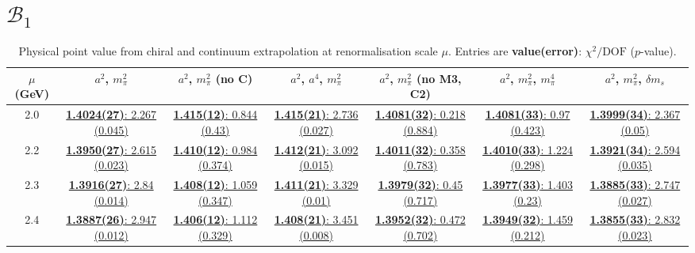 \documentclass[12pt]{extarticle}
\begin{document}
\section{$\mathcal{B}_1$}
\begin{table}[h!]
\begin{center}
\begin{tabular}{|c|c|c|c|c|c|c|}
\hline
$\mu$ (GeV) & $a^2$, $m_\pi^2$& $a^2$, $m_\pi^2$ (no C)& $a^2$, $a^4$, $m_\pi^2$& $a^2$, $m_\pi^2$ (no M3, C2)& $a^2$, $m_\pi^2$, $m_\pi^4$& $a^2$, $m_\pi^2$, $\delta m_s$\\
\hline
2.0& \hyperlink{VVpAA/NPR/a2m2_20.pdf.1}{\textbf{1.4024(27)}: 2.267 (0.045)} & \hyperlink{VVpAA/NPR/a2m2noC_20.pdf.1}{\textbf{1.415(12)}: 0.844 (0.43)} & \hyperlink{VVpAA/NPR/a2a4m2_20.pdf.1}{\textbf{1.415(21)}: 2.736 (0.027)} & \hyperlink{VVpAA/NPR/a2m2mcut_20.pdf.1}{\textbf{1.4081(32)}: 0.218 (0.884)} & \hyperlink{VVpAA/NPR/a2m2m4_20.pdf.1}{\textbf{1.4081(33)}: 0.97 (0.423)} & \hyperlink{VVpAA/NPR/a2m2delm_20.pdf.1}{\textbf{1.3999(34)}: 2.367 (0.05)}\\
2.2& \hyperlink{VVpAA/NPR/a2m2_22.pdf.1}{\textbf{1.3950(27)}: 2.615 (0.023)} & \hyperlink{VVpAA/NPR/a2m2noC_22.pdf.1}{\textbf{1.410(12)}: 0.984 (0.374)} & \hyperlink{VVpAA/NPR/a2a4m2_22.pdf.1}{\textbf{1.412(21)}: 3.092 (0.015)} & \hyperlink{VVpAA/NPR/a2m2mcut_22.pdf.1}{\textbf{1.4011(32)}: 0.358 (0.783)} & \hyperlink{VVpAA/NPR/a2m2m4_22.pdf.1}{\textbf{1.4010(33)}: 1.224 (0.298)} & \hyperlink{VVpAA/NPR/a2m2delm_22.pdf.1}{\textbf{1.3921(34)}: 2.594 (0.035)}\\
2.3& \hyperlink{VVpAA/NPR/a2m2_23.pdf.1}{\textbf{1.3916(27)}: 2.84 (0.014)} & \hyperlink{VVpAA/NPR/a2m2noC_23.pdf.1}{\textbf{1.408(12)}: 1.059 (0.347)} & \hyperlink{VVpAA/NPR/a2a4m2_23.pdf.1}{\textbf{1.411(21)}: 3.329 (0.01)} & \hyperlink{VVpAA/NPR/a2m2mcut_23.pdf.1}{\textbf{1.3979(32)}: 0.45 (0.717)} & \hyperlink{VVpAA/NPR/a2m2m4_23.pdf.1}{\textbf{1.3977(33)}: 1.403 (0.23)} & \hyperlink{VVpAA/NPR/a2m2delm_23.pdf.1}{\textbf{1.3885(33)}: 2.747 (0.027)}\\
2.4& \hyperlink{VVpAA/NPR/a2m2_24.pdf.1}{\textbf{1.3887(26)}: 2.947 (0.012)} & \hyperlink{VVpAA/NPR/a2m2noC_24.pdf.1}{\textbf{1.406(12)}: 1.112 (0.329)} & \hyperlink{VVpAA/NPR/a2a4m2_24.pdf.1}{\textbf{1.408(21)}: 3.451 (0.008)} & \hyperlink{VVpAA/NPR/a2m2mcut_24.pdf.1}{\textbf{1.3952(32)}: 0.472 (0.702)} & \hyperlink{VVpAA/NPR/a2m2m4_24.pdf.1}{\textbf{1.3949(32)}: 1.459 (0.212)} & \hyperlink{VVpAA/NPR/a2m2delm_24.pdf.1}{\textbf{1.3855(33)}: 2.832 (0.023)}\\
\hline
\end{tabular}
\caption{Physical point value from chiral and continuum extrapolation at renormalisation scale $\mu$. Entries are \textbf{value(error)}: $\chi^2/\text{DOF}$ ($p$-value).}
\end{center}
\end{table}
\end{document}
